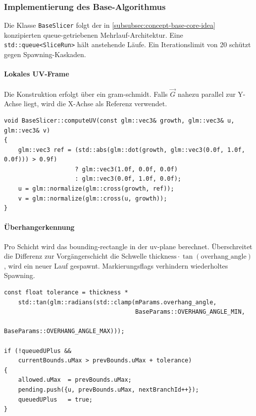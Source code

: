             \subsubsection{Implementierung des Base-Algorithmus}\label{subsubsec:impl-base-algorithm}
                Die Klasse \texttt{BaseSlicer} folgt der in \cref{subsubsec:concept-base-core-idea} konzipierten queue-getriebenen Mehrlauf-Architektur.
                Eine \texttt{std::queue<SliceRun>} hält anstehende Läufe.
                Ein Iterationslimit von 20 schützt gegen Spawning-Kaskaden.

                \paragraph{Lokales UV-Frame}\label{para:impl-base-uv-frame}
                    Die Konstruktion erfolgt über ein \gls{gram-schmidt}.
                    Falls $\vec{G}$ nahezu parallel zur Y-Achse liegt, wird die X-Achse als Referenz verwendet.

                    \begin{lstlisting}[style=cppStyle, caption={Konstruktion des lokalen UV-Frames.}, label={lst:impl-base-uvframe}]
void BaseSlicer::computeUV(const glm::vec3& growth, glm::vec3& u, glm::vec3& v)
{
    glm::vec3 ref = (std::abs(glm::dot(growth, glm::vec3(0.0f, 1.0f, 0.0f))) > 0.9f)
                    ? glm::vec3(1.0f, 0.0f, 0.0f)
                    : glm::vec3(0.0f, 1.0f, 0.0f);
    u = glm::normalize(glm::cross(growth, ref));
    v = glm::normalize(glm::cross(u, growth));
}
                    \end{lstlisting}

                \paragraph{Überhangerkennung}\label{para:impl-base-overhang}
                    Pro Schicht wird das \gls{bounding-rectangle} in der \gls{uv-plane} berechnet.
                    Überschreitet die Differenz zur Vorgängerschicht die Schwelle
                    $\text{thickness} \cdot \tan(\text{overhang\_angle})$, wird ein neuer Lauf gespawnt.
                    Markierungsflags verhindern wiederholtes Spawning.

                    \begin{lstlisting}[style=cppStyle, caption={Überhangerkennung und Branch-Spawning in \texttt{+U}-Richtung (analog für $-\vec{U}$, $\pm\vec{V}$)}, label={lst:impl-base-overhang}]
const float tolerance = thickness *
    std::tan(glm::radians(std::clamp(mParams.overhang_angle,
                                     BaseParams::OVERHANG_ANGLE_MIN,
                                     BaseParams::OVERHANG_ANGLE_MAX)));

if (!queuedUPlus &&
    currentBounds.uMax > prevBounds.uMax + tolerance)
{
    allowed.uMax  = prevBounds.uMax;
    pending.push({u, prevBounds.uMax, nextBranchId++});
    queuedUPlus   = true;
}
                    \end{lstlisting}

